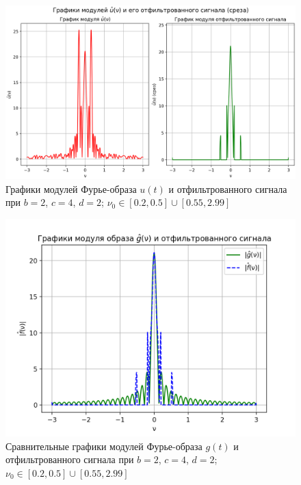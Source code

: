 \begin{figure}[ht!]
    \centering
    \includegraphics[scale=0.55]{media/1 task/specific_freq/Fourier_Image_2_4_2_-0,5_-0,2_-2,99_-0,55.png}
    \caption{Графики модулей Фурье-образа $u(t)$ и отфильтрованного сигнала при $b=2$, $c=4$, $d=2$; $\nu_0 \in [0.2, 0.5] \cup [0.55, 2.99]$}
    \label{fig:four_2_4_2_3}
\end{figure}

\clearpage

\begin{figure}[ht!]
    \centering
    \includegraphics[scale=0.55]{media/1 task/specific_freq/Fourier_Image_Comparison_2_4_2_-0,5_-0,2_-2,99_-0,55.png}
    \caption{Сравнительные графики модулей Фурье-образа $g(t)$ и отфильтрованного сигнала при $b=2$, $c=4$, $d=2$; $\nu_0 \in [0.2, 0.5] \cup [0.55, 2.99]$}
    \label{fig:fourc_2_4_2_3}
\end{figure}

